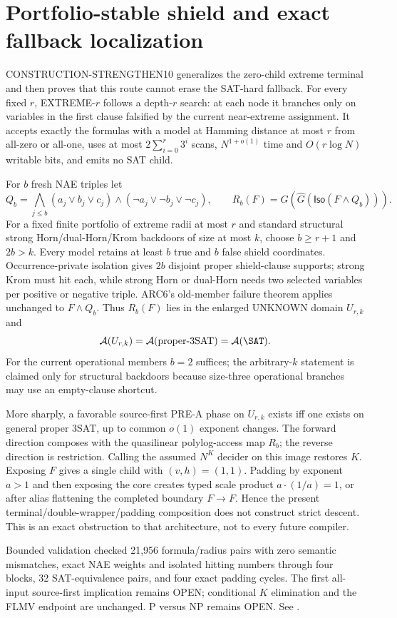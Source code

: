\section{Portfolio-stable shield and exact fallback localization}

CONSTRUCTION-STRENGTHEN10 generalizes the zero-child extreme terminal and
then proves that this route cannot erase the SAT-hard fallback.  For every
fixed $r$, \textsc{EXTREME-$r$} follows a depth-$r$ search: at each node it
branches only on variables in the first clause falsified by the current
near-extreme assignment.  It accepts exactly the formulas with a model at
Hamming distance at most $r$ from all-zero or all-one, uses at most
$2\sum_{i=0}^r3^i$ scans, $N^{1+o(1)}$ time and $O(r\log N)$ writable bits,
and emits no SAT child.

For $b$ fresh NAE triples let
\[
 Q_b=\bigwedge_{j\le b}(a_j\vee b_j\vee c_j)\wedge
 (\neg a_j\vee\neg b_j\vee\neg c_j),
 \qquad
 R_b(F)=G(\widehat G(\mathsf{Iso}(F\wedge Q_b))).
\]
For a fixed finite portfolio of extreme radii at most $r$ and standard
structural strong Horn/dual-Horn/Krom backdoors of size at most $k$, choose
$b\ge r+1$ and $2b>k$.  Every model retains at least $b$ true and $b$ false
shield coordinates.  Occurrence-private isolation gives $2b$ disjoint
proper shield-clause supports; strong Krom must hit each, while strong Horn
or dual-Horn needs two selected variables per positive or negative triple.
ARC6's old-member failure theorem applies unchanged to $F\wedge Q_b$.
Thus $R_b(F)$ lies in the enlarged UNKNOWN domain $U_{r,k}$ and
\[
 \mathcal A(U_{r,k})=\mathcal A(\text{proper-3SAT})=\mathcal A(\SAT).
\]
For the current operational members $b=2$ suffices; the arbitrary-$k$
statement is claimed only for structural backdoors because size-three
operational branches may use an empty-clause shortcut.

More sharply, a favorable source-first PRE-A phase on $U_{r,k}$ exists iff
one exists on general proper 3SAT, up to common $o(1)$ exponent changes.  The
forward direction composes with the quasilinear polylog-access map $R_b$; the
reverse direction is restriction.  Calling the assumed $N^K$ decider on this
image restores $K$.  Exposing $F$ gives a single child with $(v,h)=(1,1)$.
Padding by exponent $a>1$ and then exposing the core creates typed scale
product $a\cdot(1/a)=1$, or after alias flattening the completed boundary
$F\to F$.  Hence the present terminal/double-wrapper/padding composition
does not construct strict descent.  This is an exact obstruction to that
architecture, not to every future compiler.

Bounded validation checked 21,956 formula/radius pairs with zero semantic
mismatches, exact NAE weights and isolated hitting numbers through four
blocks, 32 SAT-equivalence pairs, and four exact padding cycles.  The first
all-input source-first implication remains OPEN; conditional $K$ elimination
and the FLMV endpoint are unchanged.  P versus NP remains OPEN.  See
.
